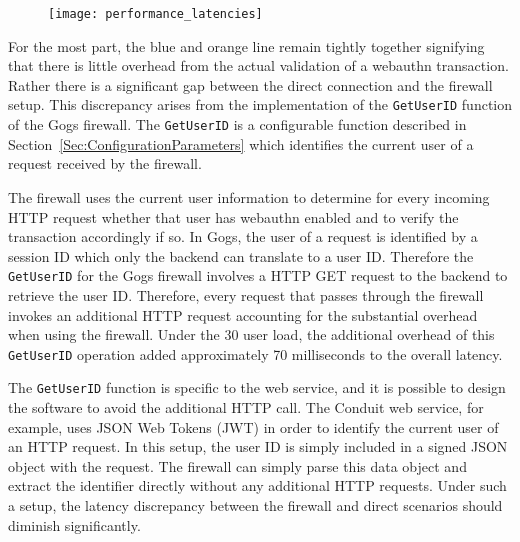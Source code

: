 \begin{figure}[h]
  \centering
  \texttt{[image: performance\_latencies]}
\end{figure}

For the most part, the blue and orange line remain tightly together signifying that there is little overhead from the actual validation of a webauthn transaction. Rather there is a significant gap between the direct connection and the firewall setup. This discrepancy arises from the implementation of the \lstinline{GetUserID} function of the Gogs firewall. The \lstinline{GetUserID} is a configurable function described in Section~\ref{Sec:ConfigurationParameters} which identifies the current user of a request received by the firewall. 

The firewall uses the current user information to determine for every incoming HTTP request whether that user has webauthn enabled and to verify the transaction accordingly if so. In Gogs, the user of a request is identified by a session ID which only the backend can translate to a user ID. Therefore the \lstinline{GetUserID} for the Gogs firewall involves a HTTP GET request to the backend to retrieve the user ID. Therefore, every request that passes through the firewall invokes an additional HTTP request accounting for the substantial overhead when using the firewall. Under the 30 user load, the additional overhead of this \lstinline{GetUserID} operation added approximately 70 milliseconds to the overall latency.

The \lstinline{GetUserID} function is specific to the web service, and it is possible to design the software to avoid the additional HTTP call. The Conduit web service, for example, uses JSON Web Tokens (JWT) in order to identify the current user of an HTTP request. In this setup, the user ID is simply included in a signed JSON object with the request. The firewall can simply parse this data object and extract the identifier directly without any additional HTTP requests. Under such a setup, the latency discrepancy between the firewall and direct scenarios should diminish significantly.

\iffalse
There are three measurements

There naturally is a performance overhead suffered because of the .

  it naturally does add performance overhead.

Despite all of the advantages laid out by the webauthn firewall,
\fi
